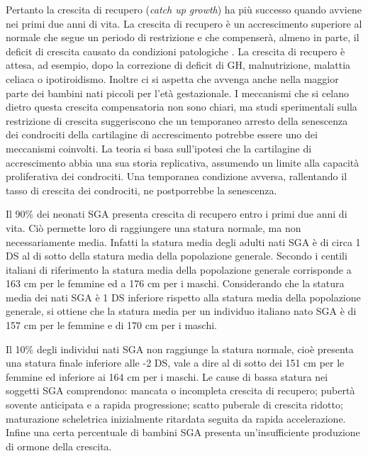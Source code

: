  Pertanto la crescita di recupero (\textit{catch up growth}) ha più successo quando avviene nei primi due anni di vita. La crescita di recupero è un accrescimento superiore al normale che segue un periodo di restrizione e che compenserà, almeno in parte, il deficit di crescita causato da condizioni patologiche \cite{boersma1997catch}.
La crescita di recupero è attesa, ad esempio, dopo la correzione di deficit di GH, malnutrizione, malattia celiaca o ipotiroidismo. Inoltre ci si aspetta che avvenga anche nella maggior parte dei bambini nati piccoli per l'età gestazionale. I meccanismi che si celano dietro questa crescita compensatoria non sono chiari, ma studi sperimentali sulla restrizione di crescita suggeriscono che un temporaneo arresto della senescenza dei condrociti della cartilagine di accrescimento potrebbe essere uno dei meccanismi 
coinvolti.
La teoria si basa sull'ipotesi che la cartilagine di accrescimento abbia una sua storia replicativa, assumendo un limite alla capacità proliferativa dei condrociti. Una temporanea condizione avversa, rallentando il tasso di crescita dei condrociti, ne postporrebbe la senescenza.\cite{gafni2001catch} 


Il 90\% dei neonati SGA presenta crescita di recupero entro i primi due anni di
vita\cite{karlberg1995growth}. Ciò permette loro di raggiungere una statura normale, ma non necessariamente media. Infatti la statura media degli adulti nati SGA è di circa 1 DS al di sotto della statura 
media della popolazione generale\cite{leger1997reduced}. Secondo i centili italiani di riferimento \cite{cacciari2006italian} la statura media della popolazione generale corrisponde a 163 cm per le femmine ed a 176 cm per i maschi. Considerando che la statura media dei nati SGA è 1 DS inferiore rispetto alla statura media della popolazione generale,   
si ottiene che la statura media per un individuo italiano nato SGA è di 157 cm per le femmine e di 170 cm per i maschi. 


Il 10\% degli individui nati SGA non raggiunge la statura normale, cioè presenta una statura finale inferiore alle -2 DS, vale a dire al di sotto dei 151 cm per le femmine ed inferiore ai 164 cm per i maschi. 
Le cause di bassa statura nei soggetti SGA comprendono: mancata o incompleta crescita di recupero; pubertà sovente anticipata e a rapida progressione; scatto puberale di crescita ridotto; maturazione scheletrica inizialmente ritardata seguita da rapida accelerazione. Infine una certa percentuale di bambini SGA presenta un'insufficiente produzione di ormone della crescita\cite{leger1997reduced}.
 

